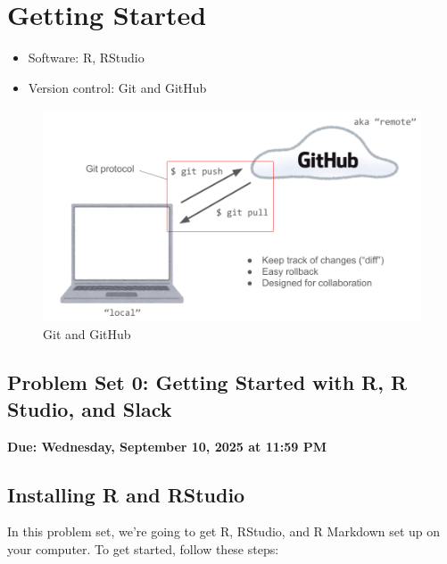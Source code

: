 \documentclass[
  11pt,
  letterpaper]{article}
\begin{document}
\section{Getting Started}\label{getting-started}

\begin{itemize}
\item
  Software: R, RStudio
\item
  Version control: Git and GitHub
\end{itemize}

\begin{figure}
\centering
\includegraphics[width=0.75\linewidth,height=\textheight,keepaspectratio]{assets/gitvsgithub.png}
\caption{Git and GitHub}
\end{figure}

\newpage

\begin{center}
  \section{Problem Set 0: Getting Started with R, R Studio, and Slack}
  \textbf{Due: Wednesday, September 10, 2025 at 11:59 PM}
\end{center}

\subsection{Installing R and RStudio}\label{installing-r-and-rstudio}

In this problem set, we're going to get R, RStudio, and R Markdown set
up on your computer. To get started, follow these steps:
\end{document}
